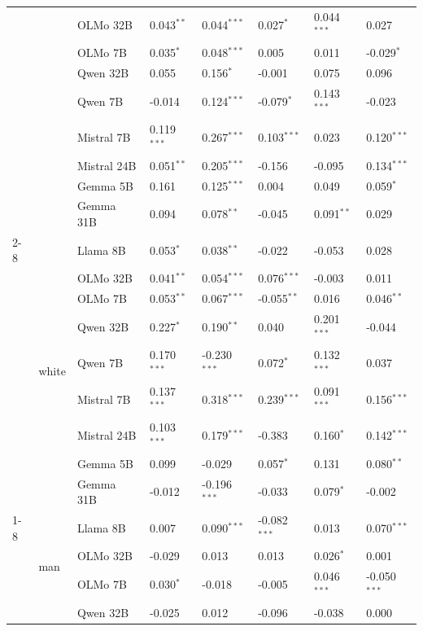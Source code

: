 \begin{longtable}[t]{llllllll}
 &  & OLMo 32B & 0.043$^{**}$ & 0.044$^{***}$ & 0.027$^{*}$ & 0.044$^{***}$ & 0.027 \\
 &  & OLMo 7B & 0.035$^{*}$ & 0.048$^{***}$ & 0.005 & 0.011 & -0.029$^{*}$ \\
 &  & Qwen 32B & 0.055 & 0.156$^{*}$ & -0.001 & 0.075 & 0.096 \\
 &  & Qwen 7B & -0.014 & 0.124$^{***}$ & -0.079$^{*}$ & 0.143$^{***}$ & -0.023 \\
 &  & Mistral 7B & 0.119$^{***}$ & 0.267$^{***}$ & 0.103$^{***}$ & 0.023 & 0.120$^{***}$ \\
 &  & Mistral 24B & 0.051$^{**}$ & 0.205$^{***}$ & -0.156 & -0.095 & 0.134$^{***}$ \\
 &  & Gemma 5B & 0.161 & 0.125$^{***}$ & 0.004 & 0.049 & 0.059$^{*}$ \\
 &  & Gemma 31B & 0.094 & 0.078$^{**}$ & -0.045 & 0.091$^{**}$ & 0.029 \\
\cline{2-8}
 & \multirow[t]{9}{*}{white} & Llama 8B & 0.053$^{*}$ & 0.038$^{**}$ & -0.022 & -0.053 & 0.028 \\
 &  & OLMo 32B & 0.041$^{**}$ & 0.054$^{***}$ & 0.076$^{***}$ & -0.003 & 0.011 \\
 &  & OLMo 7B & 0.053$^{**}$ & 0.067$^{***}$ & -0.055$^{**}$ & 0.016 & 0.046$^{**}$ \\
 &  & Qwen 32B & 0.227$^{*}$ & 0.190$^{**}$ & 0.040 & 0.201$^{***}$ & -0.044 \\
 &  & Qwen 7B & 0.170$^{***}$ & -0.230$^{***}$ & 0.072$^{*}$ & 0.132$^{***}$ & 0.037 \\
 &  & Mistral 7B & 0.137$^{***}$ & 0.318$^{***}$ & 0.239$^{***}$ & 0.091$^{***}$ & 0.156$^{***}$ \\
 &  & Mistral 24B & 0.103$^{***}$ & 0.179$^{***}$ & -0.383 & 0.160$^{*}$ & 0.142$^{***}$ \\
 &  & Gemma 5B & 0.099 & -0.029 & 0.057$^{*}$ & 0.131 & 0.080$^{**}$ \\
 &  & Gemma 31B & -0.012 & -0.196$^{***}$ & -0.033 & 0.079$^{*}$ & -0.002 \\
\cline{1-8} \cline{2-8}
\multirow[t]{27}{*}{Gender} & \multirow[t]{9}{*}{man} & Llama 8B & 0.007 & 0.090$^{***}$ & -0.082$^{***}$ & 0.013 & 0.070$^{***}$ \\
 &  & OLMo 32B & -0.029 & 0.013 & 0.013 & 0.026$^{*}$ & 0.001 \\
 &  & OLMo 7B & 0.030$^{*}$ & -0.018 & -0.005 & 0.046$^{***}$ & -0.050$^{***}$ \\
 &  & Qwen 32B & -0.025 & 0.012 & -0.096 & -0.038 & 0.000 \\

\end{longtable}
